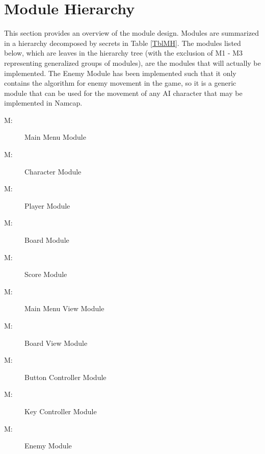 \documentclass[12pt, titlepage]{article}
\newcounter{mnum}
\newcommand{\mthemnum}{M\themnum}
\begin{document}
\section{Module Hierarchy} \label{SecMH}

This section provides an overview of the module design. Modules are summarized
in a hierarchy decomposed by secrets in Table \ref{TblMH}. The modules listed
below, which are leaves in the hierarchy tree (with the exclusion of M1 - M3 representing generalized groups of modules), are the modules that will
actually be implemented. The Enemy Module has been implemented such that it only
contains the algorithm for enemy movement in the game, so it is a generic
module that can be used for the movement of any AI character that may be
implemented in Namcap.

\begin{description}
\item [ \mthemnum \label{mMM}:] Main Menu Module
\item [ \mthemnum \label{mC}:] Character Module
\item [ \mthemnum \label{mP}:] Player Module
\item [ \mthemnum \label{mB}:] Board Module
\item [ \mthemnum \label{mS}:] Score Module
\item [ \mthemnum \label{mMV}:] Main Menu View Module
\item [ \mthemnum \label{mBV}:] Board View Module
\item [ \mthemnum \label{mBC}:] Button Controller Module
\item [ \mthemnum \label{mKC}:] Key Controller Module
\item [ \mthemnum \label{mG}:] Enemy Module
\end{description}
\end{document}
